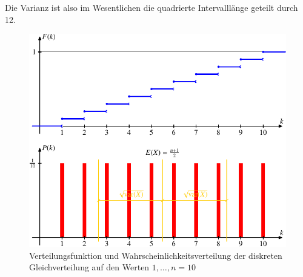Die Varianz ist also im Wesentlichen die quadrierte Intervalllänge
geteilt durch 12.
\begin{figure}
\centering
\includegraphics{images/gl-2.pdf}
\caption{Verteilungsfunktion und Wahrscheinlichkeitsverteilung der diskreten
Gleichverteilung auf den Werten $1,\dots,n=10$
\label{diskrete-gleichverteilung}}
\end{figure}

